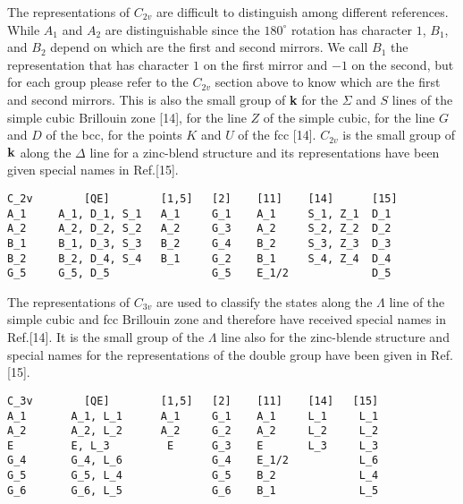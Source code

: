 \documentclass[12pt,a4paper,twoside]{report}
\begin{document}
The representations of $C_{2v}$ are difficult to distinguish among different
references. While $A_1$ and $A_2$ are distinguishable since the 
$180^\circ$ rotation has character $1$, $B_1$, and $B_2$ depend on which 
are the first and second mirrors. 
We call $B_1$ the representation that has character $1$ on the first mirror and 
$-1$ on the second, but for each group please refer to the $C_{2v}$ section
above to know which are the first and second mirrors. 
This is also the small group
of {\bf k} for the $\Sigma$ and $S$ lines of the simple cubic Brillouin 
zone [14],
for the line $Z$ of the simple cubic, for the line $G$ and $D$ of the bcc, 
for the points $K$ and $U$ of the fcc [14]. $C_{2v}$ is the small group
of ${\bf k}$ along the $\Delta$ line for a zinc-blend structure and
its representations have been given special names in Ref.[15]. 

\begin{tcolorbox}
\begin{footnotesize}
\begin{verbatim}
C_2v        [QE]        [1,5]   [2]    [11]    [14]      [15]
A_1     A_1, D_1, S_1   A_1     G_1    A_1     S_1, Z_1  D_1
A_2     A_2, D_2, S_2   A_2     G_3    A_2     S_2, Z_2  D_2
B_1     B_1, D_3, S_3   B_2     G_4    B_2     S_3, Z_3  D_3
B_2     B_2, D_4, S_4   B_1     G_2    B_1     S_4, Z_4  D_4
G_5     G_5, D_5                G_5    E_1/2             D_5
\end{verbatim}
\end{footnotesize}
\end{tcolorbox}

The representations of $C_{3v}$ are used to classify the states along the 
$\Lambda$ line of the simple cubic and fcc Brillouin zone and therefore have
received special names in Ref.[14]. It is the small group of the $\Lambda$ 
line also for the zinc-blende structure and special names for the 
representations of the double group have been given in Ref.[15].

\begin{tcolorbox}
\begin{footnotesize}
\begin{verbatim}
C_3v        [QE]        [1,5]   [2]    [11]    [14]   [15]
A_1       A_1, L_1      A_1     G_1    A_1     L_1     L_1
A_2       A_2, L_2      A_2     G_2    A_2     L_2     L_2
E         E, L_3         E      G_3    E       L_3     L_3
G_4       G_4, L_6              G_4    E_1/2           L_6
G_5       G_5, L_4              G_5    B_2             L_4
G_6       G_6, L_5              G_6    B_1             L_5
\end{verbatim}
\end{footnotesize}
\end{tcolorbox}
\end{document}
